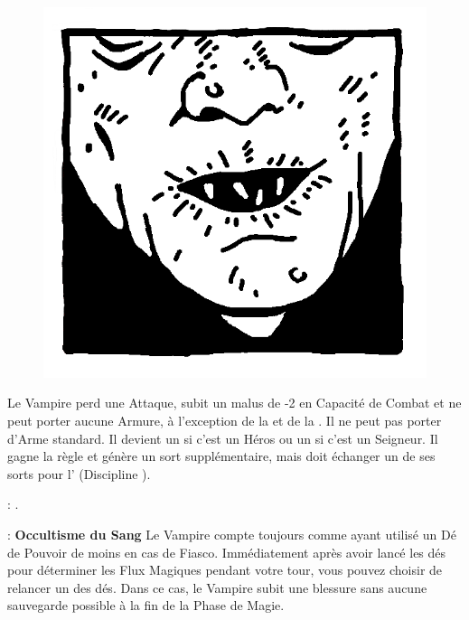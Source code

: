 \begin{figure}
\centering
\includegraphics[width=\logosize]{pics/logo_nosferatu.png}
\end{figure}
Le Vampire perd une Attaque, subit un malus de -2 en Capacité de Combat et ne peut porter aucune Armure, à l'exception de la \mountsprotection{} et de la \innatedefence{}. Il ne peut pas porter d'Arme standard. Il devient un  si c'est un Héros ou un  si c'est un Seigneur. Il gagne la règle \awaken{\skeletons{}, \zombies{}} et génère un sort supplémentaire, mais doit échanger un de ses sorts pour l'\necromancysignaturespell{} (Discipline \necromancy{}).

\vspace{0.5cm}
\bloodties{} : \textbf{\wraiths{}}.

\vspace{0.5cm}
\ancientbloodpower{} : \textbf{Occultisme du Sang}\dotfill{}\newline%
Le Vampire compte toujours comme ayant utilisé un Dé de Pouvoir de moins en cas de Fiasco. Immédiatement après avoir lancé les dés pour déterminer les Flux Magiques pendant votre tour, vous pouvez choisir de relancer un des dés. Dans ce cas, le Vampire subit une blessure sans aucune sauvegarde possible à la fin de la Phase de Magie.

\closearmynewsection

